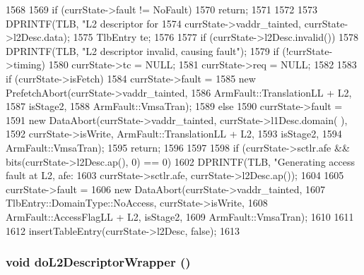 \begin{DoxyCode}
1568 {
1569     if (currState->fault != NoFault) {
1570         return;
1571     }
1572 
1573     DPRINTF(TLB, "L2 descriptor for %
1574             currState->vaddr_tainted, currState->l2Desc.data);
1575     TlbEntry te;
1576 
1577     if (currState->l2Desc.invalid()) {
1578         DPRINTF(TLB, "L2 descriptor invalid, causing fault\n");
1579         if (!currState->timing) {
1580             currState->tc = NULL;
1581             currState->req = NULL;
1582         }
1583         if (currState->isFetch)
1584             currState->fault =
1585                 new PrefetchAbort(currState->vaddr_tainted,
1586                                   ArmFault::TranslationLL + L2,
1587                                   isStage2,
1588                                   ArmFault::VmsaTran);
1589         else
1590             currState->fault =
1591                 new DataAbort(currState->vaddr_tainted, currState->l1Desc.domain(
      ),
1592                               currState->isWrite, ArmFault::TranslationLL + L2,
1593                               isStage2,
1594                               ArmFault::VmsaTran);
1595         return;
1596     }
1597 
1598     if (currState->sctlr.afe && bits(currState->l2Desc.ap(), 0) == 0) {
1602          DPRINTF(TLB, "Generating access fault at L2, afe: %
1603                  currState->sctlr.afe, currState->l2Desc.ap());
1604 
1605         currState->fault =
1606             new DataAbort(currState->vaddr_tainted,
1607                           TlbEntry::DomainType::NoAccess, currState->isWrite,
1608                           ArmFault::AccessFlagLL + L2, isStage2,
1609                           ArmFault::VmsaTran);
1610     }
1611 
1612     insertTableEntry(currState->l2Desc, false);
1613 }
\end{DoxyCode}
\hypertarget{classArmISA_1_1TableWalker_a87d50eb887f4953c0b6881863b71df37}{
\subsubsection[{doL2DescriptorWrapper}]{\setlength{\rightskip}{0pt plus 5cm}void doL2DescriptorWrapper ()}}
\label{classArmISA_1_1TableWalker_a87d50eb887f4953c0b6881863b71df37}



